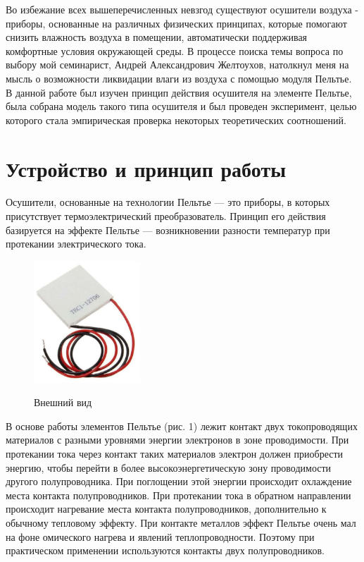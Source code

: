 \documentclass[a4paper,12pt]{article} %
\begin{document}
Во избежание всех вышеперечисленных невзгод существуют осушители воздуха - приборы, основанные на различных физических принципах, которые помогают снизить влажность воздуха в помещении, автоматически поддерживая комфортные условия окружающей среды. В процессе поиска темы вопроса по выбору мой семинарист, Андрей Александрович Желтоухов, натолкнул меня на мысль о возможности ликвидации влаги из воздуха с помощью модуля Пельтье. В данной работе был изучен принцип действия осушителя на элементе Пельтье, была собрана модель такого типа осушителя и был проведен эксперимент, целью которого стала эмпирическая проверка некоторых теоретических соотношений.


\newpage


\section{Устройство и принцип работы}
Осушители, основанные на технологии Пельтье --- это приборы, в которых присутствует термоэлектрический преобразователь. Принцип его действия базируется на эффекте Пельтье --- возникновении разности температур при протекании электрического тока.

\begin{figure}
\includegraphics[width=4cm]{pictures/pict/unnamed.jpg}
\label{fig:image}
\caption{Внешний вид}
\end{figure}
В основе работы элементов Пельтье (рис. 1) лежит контакт двух токопроводящих материалов с разными уровнями энергии электронов в зоне проводимости. При протекании тока через контакт таких материалов электрон должен приобрести энергию, чтобы перейти в более высокоэнергетическую зону проводимости другого полупроводника. При поглощении этой энергии происходит охлаждение места контакта полупроводников. При протекании тока в обратном направлении происходит нагревание места контакта полупроводников, дополнительно к обычному тепловому эффекту.
При контакте металлов эффект Пельтье очень мал на фоне омического нагрева и явлений теплопроводности. Поэтому при практическом применении используются контакты двух полупроводников.
\end{document}
